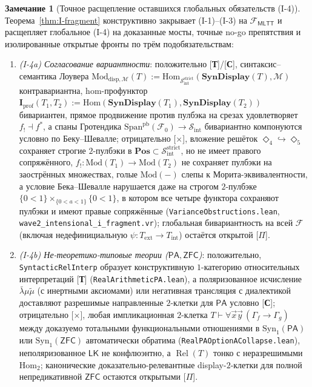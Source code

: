 \documentclass[11pt]{article}
\theoremstyle{plain}
\theoremstyle{definition}
\newtheorem{remark}[theorem]{Замечание}
\newcommand{\cS}{\mathcal{S}}
\newcommand{\cF}{\mathcal{F}}
\newcommand{\Sint}{\cS_{\mathrm{int}}}
\newcommand{\Hom}{\mathrm{Hom}}
\newcommand{\Syn}{\mathrm{Syn}}
\newcommand{\Mod}{\mathrm{Mod}}
\newcommand{\PA}{\mathsf{PA}}
\newcommand{\ZFC}{\mathsf{ZFC}}
\newcommand{\MLTT}{\mathsf{MLTT}}
\begin{document}
\begin{remark}[Точное расщепление оставшихся глобальных обязательств (I-4)]\label{rem:I4-isolation}
Теорема~\ref{thm:I-fragment} конструктивно закрывает (I-1)--(I-3) на $\mathcal{F}_{\MLTT}$ и расщепляет глобальное (I-4) на доказанные мосты, точные no-go препятствия и изолированные открытые фронты по трём подобязательствам:
\begin{enumerate}[nosep,label=\textup{(\alph*)}]
\item \emph{\textup{(I-4a)} Согласование вариантности}: положительно \textup{[\textbf{Т}]/[\textbf{С}]}, синтаксис--семантика Лоувера $\Mod_{\mathrm{disp},\mathcal{M}}(T) := \Hom_{\mathcal{S}_{\mathrm{int}}^{\mathrm{strict}}}(\mathbf{SynDisplay}(T), \mathcal{M})$ контравариантна, hom-профунктор $\mathbf{I}_{\mathrm{prof}}(T_1, T_2) := \Hom(\mathbf{SynDisplay}(T_1), \mathbf{SynDisplay}(T_2))$ бивариантен, прямое продвижение против пулбэка на срезах удовлетворяет $f_! \dashv f^*$, а спаны Гротендика $\mathrm{Span}^{\mathrm{pb}}(\cF_0) \to \Sint$ бивариантно компонуются условно по Беку--Шевалле; отрицательно \textup{[\textbf{$\times$}]}, вложение решёток $\Diamond_4 \hookrightarrow \Diamond_5$ сохраняет строгие $2$-пулбэки в $\mathbf{Pos} \subset \mathcal{S}_{\mathrm{int}}^{\mathrm{strict}}$, но не имеет правого сопряжённого, $f_! : \Mod(T_1) \to \Mod(T_2)$ не сохраняет пулбэки на заострённых множествах, голые $\Mod(-)$ слепы к Морита-эквивалентности, а условие Бека--Шевалле нарушается даже на строгом $2$-пулбэке $\{0<1\} \times_{\{0<a<1\}} \{0<1\}$, в котором все четыре функтора сохраняют пулбэки и имеют правые сопряжённые (\texttt{VarianceObstructions.lean}, \texttt{wave2\_intensional\_i\_fragment.vr}); глобальная бивариантность на всей $\cF$ (включая недефинициальную $\psi : T_{\mathrm{ext}} \to T_{\mathrm{int}}$) остаётся открытой \textup{[\textbf{$\Pi$}]}.
\item \emph{\textup{(I-4b)} Не-теоретико-типовые теории ($\PA, \ZFC$)}: положительно, \texttt{SyntacticRelInterp} образует конструктивную $1$-категорию относительных интерпретаций \textup{[\textbf{Т}]} (\texttt{RealArithmeticPA.lean}), а поляризованное исчисление $\bar{\lambda}\mu\tilde{\mu}$ (с инертными аксиомами) или негативная трансляция с диалектикой доставляют разрешимые направленные $2$-клетки для $\PA$ условно \textup{[\textbf{С}]}; отрицательно \textup{[\textbf{$\times$}]}, любая импликационная $2$-клетка $T \vdash \forall \vec{x}\vec{y}\,(\Gamma_f \to \Gamma_g)$ между доказуемо тотальными функциональными отношениями в $\Syn_1(\PA)$ или $\Syn_1(\ZFC)$ автоматически обратима (\texttt{RealPAOptionACollapse.lean}), неполяризованное $\mathsf{LK}$ не конфлюэнтно, а $\operatorname{Rel}(T)$ тонко с неразрешимыми $\Hom_2$; канонические доказательно-релевантные display-$2$-клетки для полной непредикативной $\ZFC$ остаются открытыми \textup{[\textbf{$\Pi$}]}.

\end{enumerate}
\end{remark}
\end{document}
